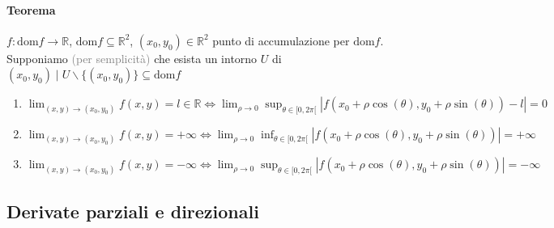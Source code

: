 \documentclass{article}
\newcommand{\R}{\mathbb{R}}
\newcommand{\dom}{\text{dom}}
\begin{document}
\paragraph{{Teorema}}
$f:\dom f \rightarrow\R$, $\dom f \subseteq\R^2$, $(x_0,y_0)\in \R^2$ punto di accumulazione per $\dom f$. Supponiamo \textcolor{grey}{(per semplicità)} che esista un intorno $U$ di $(x_0,y_0)\mid U\backslash \{(x_0,y_0)\}\subseteq \dom f$
\begin{enumerate}
    \item $\lim_{(x,y)\rightarrow(x_0,y_0)}f(x,y)=l\in\R \Leftrightarrow \lim_{\rho \rightarrow 0 } \sup_{\theta \in [0,2\pi[}|f(x_0+\rho\cos(\theta),y_0+\rho\sin(\theta))-l|=0$ 
    \item $\lim_{(x,y)\rightarrow(x_0,y_0)}f(x,y)=+\infty \Leftrightarrow \lim_{\rho\rightarrow 0}\inf_{\theta \in[0,2\pi[}|f(x_0+\rho \cos(\theta), y_0+\rho \sin(\theta))|=+\infty$
    \item $\lim_{(x,y)\rightarrow(x_0,y_0)}f(x,y)=-\infty\Leftrightarrow \lim_{\rho\rightarrow 0}\sup_{\theta \in[0,2\pi[}|f(x_0+\rho \cos(\theta), y_0+\rho \sin(\theta))|=-\infty$
\end{enumerate}

\subsection{{Derivate parziali e direzionali}}
\end{document}
